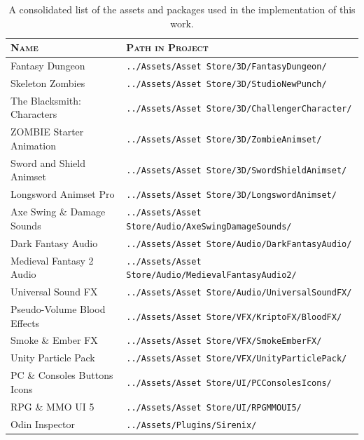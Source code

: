 \documentclass[cic,tc,english]{iiufrgs}
\begin{document}
\begin{table}
  \begin{center}
    \caption{A consolidated list of the assets and packages used in the implementation of this work.}
    \label{tab:table-game-assets}
    \begin{tabular}{ m{12em} m{20em} } %
      \textbf{\textsc{Name}}                & \textbf{\textsc{Path in Project}} \\
      \hline
      \small{Fantasy Dungeon}               & \tiny{\texttt{../Assets/Asset Store/3D/FantasyDungeon/}}        \\ 
      \hline
      \small{Skeleton Zombies}              & \tiny{\texttt{../Assets/Asset Store/3D/StudioNewPunch/}}        \\
      \hline
      \small{The Blacksmith: Characters}    & \tiny{\texttt{../Assets/Asset Store/3D/ChallengerCharacter/}}  \\ 
      \hline
      \small{ZOMBIE Starter Animation}      & \tiny{\texttt{../Assets/Asset Store/3D/ZombieAnimset/}}       \\
      \hline
      \small{Sword and Shield Animset}      & \tiny{\texttt{../Assets/Asset Store/3D/SwordShieldAnimset/}} \\
      \hline
      \small{Longsword Animset Pro}         & \tiny{\texttt{../Assets/Asset Store/3D/LongswordAnimset/}}   \\
      \hline
      \small{Axe Swing \& Damage Sounds}    & \tiny{\texttt{../Assets/Asset Store/Audio/AxeSwingDamageSounds/}} \\
      \hline
      \small{Dark Fantasy Audio}            & \tiny{\texttt{../Assets/Asset Store/Audio/DarkFantasyAudio/}} \\ \hline
      \small{Medieval Fantasy 2 Audio}      & \tiny{\texttt{../Assets/Asset Store/Audio/MedievalFantasyAudio2/}} \\ 
      \hline
      \small{Universal Sound FX}            & \tiny{\texttt{../Assets/Asset Store/Audio/UniversalSoundFX/}} \\ 
      \hline
      \small{Pseudo-Volume Blood Effects}   & \tiny{\texttt{../Assets/Asset Store/VFX/KriptoFX/BloodFX/}}  \\ 
      \hline
      \small{Smoke \& Ember FX}             & \tiny{\texttt{../Assets/Asset Store/VFX/SmokeEmberFX/}} \\ 
      \hline
      \small{Unity Particle Pack}           & \tiny{\texttt{../Assets/Asset Store/VFX/UnityParticlePack/}} \\ 
      \hline
      \small{PC \& Consoles Buttons Icons}  & \tiny{\texttt{../Assets/Asset Store/UI/PCConsolesIcons/}} \\ 
      \hline
      \small{RPG \& MMO UI 5}               & \tiny{\texttt{../Assets/Asset Store/UI/RPGMMOUI5/}} \\ 
      \hline
      \small{Odin Inspector}                & \tiny{\texttt{../Assets/Plugins/Sirenix/}} \\ 
      \hline
    \end{tabular}
  \end{center}
\end{table}
\end{document}
